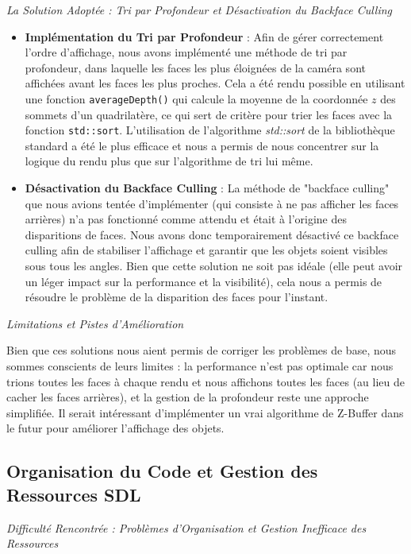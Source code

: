 \documentclass[12pt]{article}
\begin{document}
\textit{La Solution Adoptée : Tri par Profondeur et Désactivation du Backface Culling}
\begin{itemize}
    \item \textbf{Implémentation du Tri par Profondeur} : Afin de gérer correctement l'ordre d'affichage, nous avons implémenté une méthode de tri par profondeur, dans laquelle les faces les plus éloignées de la caméra sont affichées avant les faces les plus proches. Cela a été rendu possible en utilisant une fonction \texttt{averageDepth()} qui calcule la moyenne de la coordonnée $z$ des sommets d'un quadrilatère, ce qui sert de critère pour trier les faces avec la fonction \texttt{std::sort}. L'utilisation de l'algorithme \textit{std::sort} de la bibliothèque standard a été le plus efficace et nous a permis de nous concentrer sur la logique du rendu plus que sur l'algorithme de tri lui même.
    \item \textbf{Désactivation du Backface Culling} : La méthode de "backface culling" que nous avions tentée d'implémenter (qui consiste à ne pas afficher les faces arrières) n'a pas fonctionné comme attendu et était à l'origine des disparitions de faces. Nous avons donc temporairement désactivé ce backface culling afin de stabiliser l'affichage et garantir que les objets soient visibles sous tous les angles. Bien que cette solution ne soit pas idéale (elle peut avoir un léger impact sur la performance et la visibilité), cela nous a permis de résoudre le problème de la disparition des faces pour l'instant.
\end{itemize}

\textit{Limitations et Pistes d'Amélioration}

\noindent Bien que ces solutions nous aient permis de corriger les problèmes de base, nous sommes conscients de leurs limites : la performance n'est pas optimale car nous trions toutes les faces à chaque rendu et nous affichons toutes les faces (au lieu de cacher les faces arrières), et la gestion de la profondeur reste une approche simplifiée. Il serait intéressant d'implémenter un vrai algorithme de Z-Buffer dans le futur pour améliorer l'affichage des objets.

\subsection{Organisation du Code et Gestion des Ressources SDL}
\label{subsec:gestion_ressources_sdl}

\textit{Difficulté Rencontrée : Problèmes d'Organisation et Gestion Inefficace des Ressources}
\end{document}
